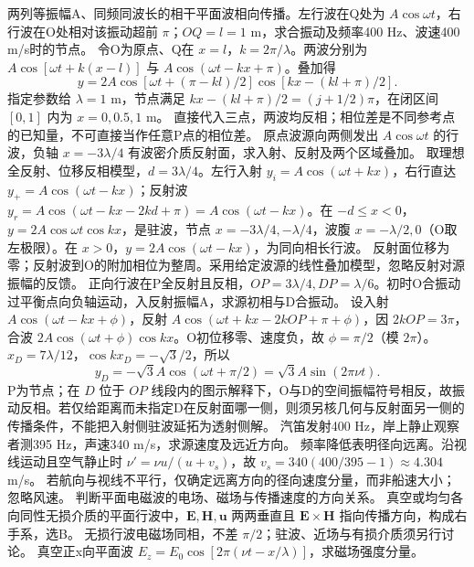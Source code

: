 \problemtext 两列等振幅A、同频同波长的相干平面波相向传播。左行波在Q处为 $A\cos\omega t$，右行波在O处相对该振动超前 $\pi$；$OQ=l=1$ m，求合振动及频率400 Hz、波速400 m/s时的节点。
\workings 令O为原点、Q在 $x=l$，$k=2\pi/\lambda$。两波分别为 $A\cos[\omega t+k(x-l)]$ 与 $A\cos(\omega t-kx+\pi)$。叠加得
\[
y=2A\cos[\omega t+(\pi-kl)/2]\cos[kx-(kl+\pi)/2].
\]
指定参数给 $\lambda=1$ m，节点满足 $kx-(kl+\pi)/2=(j+1/2)\pi$，在闭区间 $[0,1]$ 内为 $x=0,0.5,1$ m。
\crosscheck 直接代入三点，两波均反相；相位差是不同参考点的已知量，不可直接当作任意P点的相位差。
\problemtext 原点波源向两侧发出 $A\cos\omega t$ 的行波，负轴 $x=-3\lambda/4$ 有波密介质反射面，求入射、反射及两个区域叠加。
\workings 取理想全反射、位移反相模型，$d=3\lambda/4$。左行入射 $y_i=A\cos(\omega t+kx)$，右行直达 $y_+=A\cos(\omega t-kx)$；反射波 $y_r=A\cos(\omega t-kx-2kd+\pi)=A\cos(\omega t-kx)$。在 $-d\le x<0$，$y=2A\cos\omega t\cos kx$，是驻波，节点 $x=-3\lambda/4,-\lambda/4$，波腹 $x=-\lambda/2,0$（O取左极限）。在 $x>0$，$y=2A\cos(\omega t-kx)$，为同向相长行波。
\crosscheck 反射面位移为零；反射波到O的附加相位为整周。采用给定波源的线性叠加模型，忽略反射对源振幅的反馈。
\problemtext 正向行波在P全反射且反相，$OP=3\lambda/4,DP=\lambda/6$。初时O合振动过平衡点向负轴运动，入反射振幅A，求源初相与D合振动。
\workings 设入射 $A\cos(\omega t-kx+\phi)$，反射 $A\cos(\omega t+kx-2kOP+\pi+\phi)$，因 $2kOP=3\pi$，合波 $2A\cos(\omega t+\phi)\cos kx$。O初位移零、速度负，故 $\phi=\pi/2$（模 $2\pi$）。$x_D=7\lambda/12$，$\cos kx_D=-\sqrt3/2$，所以
\[
y_D=-\sqrt3A\cos(\omega t+\pi/2)=\sqrt3A\sin(2\pi\nu t).
\]
\crosscheck P为节点；在 $D$ 位于 $OP$ 线段内的图示解释下，O与D的空间振幅符号相反，故振动反相。若仅给距离而未指定D在反射面哪一侧，则须另核几何与反射面另一侧的传播条件，不能把入射侧驻波延拓为透射侧解。
\problemtext 汽笛发射400 Hz，岸上静止观察者测395 Hz，声速340 m/s，求源速度及远近方向。
\workings 频率降低表明径向远离。沿视线运动且空气静止时 $\nu'=\nu u/(u+v_s)$，故 $v_s=340(400/395-1)\approx4.304$ m/s。
\crosscheck 若航向与视线不平行，仅确定远离方向的径向速度分量，而非船速大小；忽略风速。
\problemtext 判断平面电磁波的电场、磁场与传播速度的方向关系。
\workings 真空或均匀各向同性无损介质的平面行波中，$\bm E,\bm H,\bm u$ 两两垂直且 $\bm E\times\bm H$ 指向传播方向，构成右手系，选B。
\crosscheck 无损行波电磁场同相，不差 $\pi/2$；驻波、近场与有损介质须另行讨论。
\problemtext 真空正x向平面波 $E_z=E_0\cos[2\pi(\nu t-x/\lambda)]$，求磁场强度分量。
